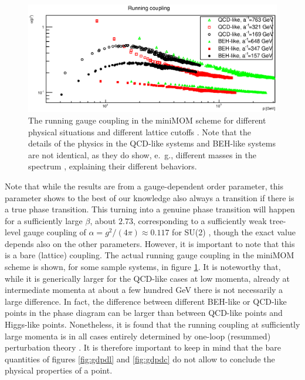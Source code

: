 \documentclass[final,twoside,12pt]{article}
\newcommand*{\1}{1\!\!\!\bot}
\begin{document}
\begin{figure}[!htbp]
\includegraphics[width=\linewidth]{alpha}
\caption{\label{fig:alpha}The running gauge coupling in the miniMOM scheme \cite{vonSmekal:2009ae} for different physical situations and different lattice cutoffs \cite{Maas:2013aia,Maas:unpublished}. Note that the details of the physics in the QCD-like systems and BEH-like systems are not identical, as they do show, e.\ g., different masses in the spectrum \cite{Maas:2013aia}, explaining their different behaviors.}
\end{figure}

Note that while the results are from a gauge-dependent order parameter, this parameter shows to the best of our knowledge also always a transition if there is a true phase transition. This turning into a genuine phase transition will happen for a sufficiently large $\beta$, about $2.73$, corresponding to a sufficiently weak tree-level gauge coupling of $\alpha=g^2/(4\pi)\approx0.117$ for SU(2) \cite{Bonati:2009pf,Bonati:2009yi}, though the exact value depends also on the other parameters. However, it is important to note that this is a bare (lattice) coupling. The actual running gauge coupling in the miniMOM scheme \cite{vonSmekal:2009ae} is shown, for some sample systems, in figure \ref{fig:alpha}. It is noteworthy that, while it is generically larger for the QCD-like cases at low momenta, already at intermediate momenta at about a few hundred GeV there is not necessarily a large difference. In fact, the difference between different BEH-like or QCD-like points in the phase diagram can be larger than between QCD-like points and Higgs-like points. Nonetheless, it is found that the running coupling at sufficiently large momenta is in all cases entirely determined by one-loop (resummed) perturbation theory \cite{Maas:2013aia}. It is therefore important to keep in mind that the bare quantities of figures \ref{fig:gdpdl} and \ref{fig:gdpdc} do not allow to conclude the physical properties of a point.
\end{document}
